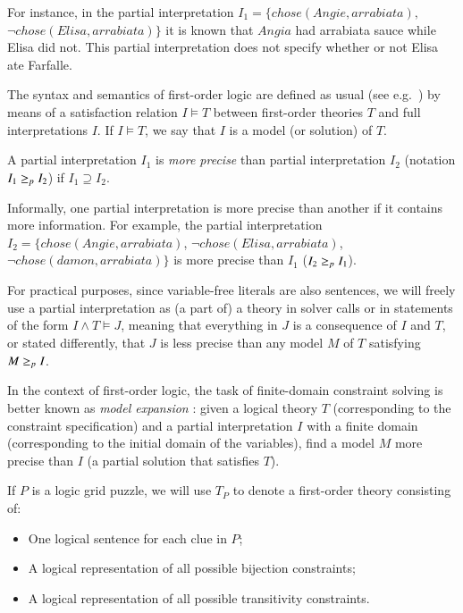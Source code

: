 For instance, in the partial interpretation $I_1=\{chose(Angie,arrabiata),$ $\lnot chose(Elisa,arrabiata)\}$ it is known that $Angia$ had arrabiata sauce while Elisa did not. This partial interpretation does not specify whether or not Elisa ate Farfalle.  


The syntax and semantics of first-order logic are defined as usual (see e.g.\ \cite{enderton}) by means of a satisfaction relation $I \models T$ between first-order theories $T$ and full interpretations $I$. If $I\models T$, we say that $I$ is a model (or solution) of $T$.


\begin{definition} %
	A partial interpretation $I_1$ is \emph{more precise} than partial interpretation $I_2$ (notation $I_1\geq_p I_2$) if $I_1\supseteq I_2$.
\end{definition}

Informally, one partial interpretation is more precise than another if it contains more information. For example, the partial interpretation $I_2 =\{chose(Angie,arrabiata)$, $\lnot chose(Elisa,arrabiata)$, $ \lnot chose(damon,arrabiata)\}$ is more precise than $I_1$ ($I_2 \geq_p I_1$).


For practical purposes, since variable-free literals are also sentences, we will freely use a partial interpretation as (a part of) a theory in solver calls or in statements of the form $I\land T \models J$, meaning that everything in $J$ is a consequence of $I$ and $T$, or stated differently, that $J$ is less precise than any model $M$ of $T$ satisfying $M\geq_p I$. 

In the context of first-order logic, the task of finite-domain constraint solving is better known as \emph{model expansion} \cite{MitchellTHM06}: given a logical theory $T$ (corresponding to the constraint specification) and a partial interpretation $I$ with a finite domain (corresponding to the initial domain of the variables), find a model $M$ more precise than $I$ (a partial solution that satisfies $T$).

If $P$ is a logic grid puzzle, we will use $T_P$ to denote a first-order theory consisting of:
\begin{itemize}
 \item One logical sentence for each clue in $P$;
 \item A logical representation of all possible bijection constraints;
 \item A logical representation of all possible transitivity constraints.
\end{itemize}

